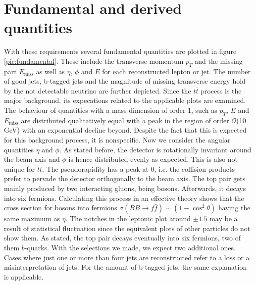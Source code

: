 \section{Fundamental and derived quantities}
With these requirements several fundamental quantities are plotted in figure \ref{pic:fundamental}. 
These include the transverse momentum $p_T$ and the missing part $E_\text{miss}$ as well as $\eta$, $\phi$ and $E$ for each reconstructed lepton or jet.
The number of good jets, b-tagged jets and the magnitude of missing transverse energy hold by the not detectable neutrino are further depicted. 
Since the $t\bar t$ process is the major background, its expecations related to the applicable plots are examined. The behaviour of quantities with
a mass dimension of order 1, such as $p_T$, $E$ and $E_\text{miss}$ are distributed qualitatively equal with a peak in the region of order 
$\mathcal{O}$(10 GeV) with an exponential decline beyond. Despite the fact that this is expected for this background process, it is nonspecific.
Now we consider the angular quantities $\eta$ and $\phi$. As stated before, the detector is rotationally invariant around the beam axis and $\phi$ is hence
distributed evenly as expected. This is also not unique for $t\bar t$. The pseudorapidity has a peak at 0, i.e. the collision products prefer to
pervade the detector orthogonally to the beam axis. The top pair gets mainly produced by two interacting gluons, being bosons. Afterwards, it decays into six fermions.
Calculating this process in an effective theory shows that the cross section for bosons into fermions $\sigma(BB\rightarrow f\bar f)\sim (1-\cos^2\theta)$
having the same maximum as $\eta$. The notches in the leptonic plot around $\pm 1.5$ may be a result of statistical fluctuation since the equivalent
plots of other particles do not show them. As stated, the top pair decays eventually into six fermions, two of them $b$-quarks. With the selections we made, we expect 
two additional ones. Cases where just one or more than four jets are reconstructed refer to a loss or a misinterpretation of jets. For the amount
of b-tagged jets, the same explanation is applicable. %
